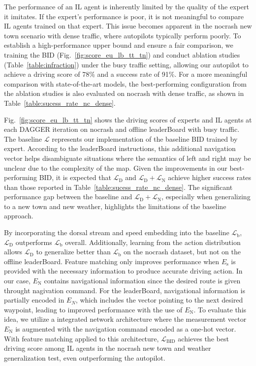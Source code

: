 \hspace{1pc}The performance of an IL agent is inherently limited by the quality of the expert it imitates. 
If the expert's performance is poor, it is not meaningful to compare IL agents trained on that expert. 
This issue becomes apparent in the nocrash new town scenario with dense traffic, where autopilots typically perform poorly. 
To establish a high-performance upper bound and ensure a fair comparison, we training the BID (Fig.~\ref{fig:score_eu_lb_tt_tn}) and conduct ablation studies (Table~\ref{table:infraction}) under the busy traffic setting, allowing our autopilot to achieve a driving score of 78\% and a success rate of 91\%. 
For a more meaningful comparison with state-of-the-art models, the best-performing configuration from the ablation studies is also evaluated on nocrash with dense traffic, as shown in Table~\ref{table:sucess_rate_nc_dense}.


Fig.~\ref{fig:score_eu_lb_tt_tn} shows the driving scores of experts and IL agents at each DAGGER iteration on nocrash and offline leaderBoard with busy traffic.
The baseline $\mathcal{L}$ represents our implementation of the baseline BID trained by expert. 
According to the leaderBoard instructions, this additional navigation vector helps disambiguate situations where the semantics of left and right may be unclear due to the complexity of the map.
Given the improvements in our best-performing BID, it is expected that $\mathcal{L}_\text{D}$ and $\mathcal{L}_\text{D} + \mathcal{L}_\text{N}$ achieve higher success rates than those reported in Table~\ref{table:sucess_rate_nc_dense}.
The significant performance gap between the baseline and $\mathcal{L}_\text{D} + \mathcal{L}_\text{N}$, especially when generalizing to a new town and new weather, highlights the limitations of the baseline approach.


By incorporating the dorsal stream and speed embedding into the baseline $\mathcal{L}_\text{b}$, $\mathcal{L}_\text{D}$ outperforms $\mathcal{L}_\text{b}$ overall.
Additionally, learning from the action distribution allows $\mathcal{L}_\text{D}$ to generalize better than $\mathcal{L}_\text{b}$ on the nocrash dataset, but not on the offline leaderBoard.
Feature matching only improves performance when $E_\text{s}$ is provided with the necessary information to produce accurate driving action.
In our case, $E_\text{N}$ contains navigational information since the desired route is given throught nagivation command.
For the leaderBoard, navigational information is partially encoded in $E_N$, which includes the vector pointing to the next desired waypoint, leading to improved performance with the use of $E_\text{N}$.
To evaluate this idea, we utilize a integrated network architecture where the measurement vector $E_\text{N}$ is augmented with the navigation command encoded as a one-hot vector.
With feature matching applied to this architecture, $\mathcal{L}_\text{BID}$ achieves the best driving score among IL agents in the nocrash new town and weather generalization test, even outperforming the autopilot.



